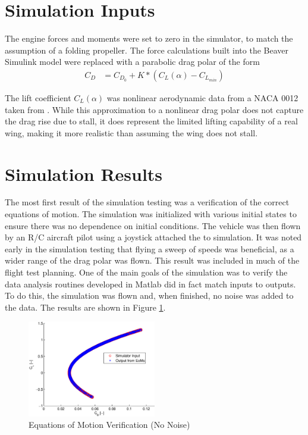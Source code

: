 \documentclass[12pt]{ucthesis}
\begin{document}
\section{Simulation Inputs}
The engine forces and moments were set to zero in the simulator, to match the assumption of a folding propeller.
The force calculations built into the Beaver Simulink model were replaced with a parabolic drag polar of the form
\begin{align}
C_D &= C_{D_0} + K*(C_L(\alpha)-C_{L_{min}})
\end{align}

The lift coefficient $C_L(\alpha)$ was nonlinear aerodynamic data from a NACA 0012 taken from \cite{osborne2007transitions}. While this approximation to a nonlinear drag polar does not capture the drag rise due to stall, it does represent the limited lifting capability of a real wing, making it more realistic than assuming the wing does not stall.
\section{Simulation Results}
The most first result of the simulation testing was a verification of the correct equations of motion. The simulation was initialized with various initial states to ensure there was no dependence on initial conditions. The vehicle was then flown by an R/C aircraft pilot using a joystick attached the to simulation. It was noted early in the simulation testing that flying a sweep of speeds was beneficial, as a wider range of the drag polar was flown. This result was included in much of the flight test planning.
One of the main goals of the simulation was to verify the data analysis routines developed in Matlab did in fact match inputs to outputs. To do this, the simulation was flown and, when finished, no noise was added to the data. The results are shown in Figure \ref{dragPolarNoNoise}.

\begin{figure}[h!]
  \caption{Equations of Motion Verification (No Noise)} \label{dragPolarNoNoise}
  \centering
    \includegraphics[width=0.5\textwidth]{figures/dragPolarNoNoise.eps}
\end{figure}
\end{document}
